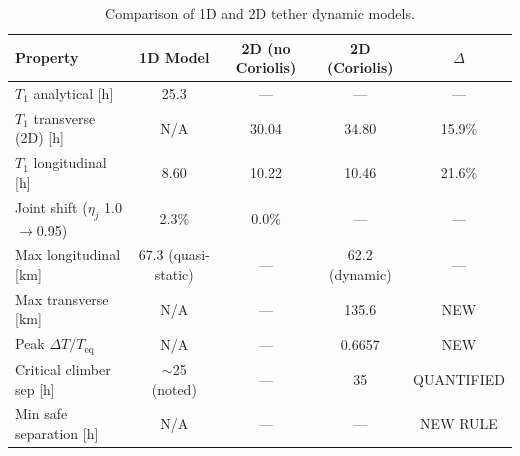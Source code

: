 \begin{table}[htbp]
\centering
\caption{Comparison of 1D and 2D tether dynamic models.}
\label{tab:dynamics_comparison}
\begin{tabular}{lcccc}
\toprule
Property & 1D Model & 2D (no Coriolis) & 2D (Coriolis) & $\Delta$ \\
\midrule
$T_1$ analytical [h] & 25.3 & --- & --- & --- \\
$T_1$ transverse (2D) [h] & N/A & 30.04 & 34.80 & 15.9\% \\
$T_1$ longitudinal [h] & 8.60 & 10.22 & 10.46 & 21.6\% \\
Joint shift ($\eta_j$ 1.0$\to$0.95) & 2.3\% & 0.0\% & --- & --- \\
Max longitudinal [km] & 67.3 (quasi-static) & --- & 62.2 (dynamic) & --- \\
Max transverse [km] & N/A & --- & 135.6 & NEW \\
Peak $\Delta T / T_\mathrm{eq}$ & N/A & --- & 0.6657 & NEW \\
Critical climber sep [h] & $\sim$25 (noted) & --- & 35 & QUANTIFIED \\
Min safe separation [h] & N/A & --- & --- & NEW RULE \\
\bottomrule
\end{tabular}
\end{table}
